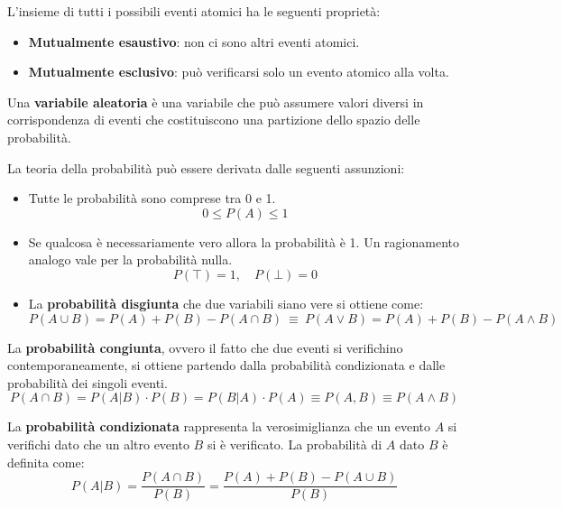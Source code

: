 L'insieme di tutti i possibili eventi atomici ha le seguenti proprietà:
\begin{itemize}
    \item \textbf{Mutualmente esaustivo}: non ci sono altri eventi atomici.
    \item \textbf{Mutualmente esclusivo}: può verificarsi solo un evento atomico
          alla volta.
\end{itemize}
\begin{definizione}
    Una \textbf{variabile aleatoria} è una variabile che può assumere valori
    diversi in corrispondenza di eventi che costituiscono una partizione dello
    spazio delle probabilità.
\end{definizione}
La teoria della probabilità può essere derivata dalle seguenti assunzioni:
\begin{itemize}
    \item Tutte le probabilità sono comprese tra 0 e 1.
          \begin{equation}
              0 \leq P(A) \leq 1
          \end{equation}
    \item Se qualcosa è necessariamente vero allora la probabilità è 1. Un
          ragionamento analogo vale per la probabilità nulla.
          \begin{equation}
              P(\top) = 1, \quad P(\bot) = 0
          \end{equation}
    \item La \textbf{probabilità disgiunta} che due variabili siano vere si
          ottiene come:
          \begin{equation}
              P(A \cup B) = P(A) + P(B) - P(A \cap B) \ \equiv \ P(A \lor B) =
              P(A) + P(B) - P(A \land B)
          \end{equation}
\end{itemize}
\begin{definizione}
    La \textbf{probabilità congiunta}, ovvero il fatto che due eventi si
    verifichino contemporaneamente, si ottiene partendo dalla probabilità
    condizionata e dalle probabilità dei singoli eventi.
    \begin{equation}
        P(A \cap B) = P(A|B) \cdot P(B) = P(B|A) \cdot P(A) \equiv P(A, B) \equiv
        P(A \land B)
    \end{equation}
\end{definizione}
\begin{definizione}
    La \textbf{probabilità condizionata} rappresenta la verosimiglianza che un
    evento $A$ si verifichi dato che un altro evento $B$ si è verificato.
    La probabilità di $A$ dato $B$ è definita come:
    \begin{equation}
        P(A|B) = \frac{P(A \cap B)}{P(B)} = \frac{P(A) + P(B) - P(A \cup B)}{P(B)}
    \end{equation}
\end{definizione}
